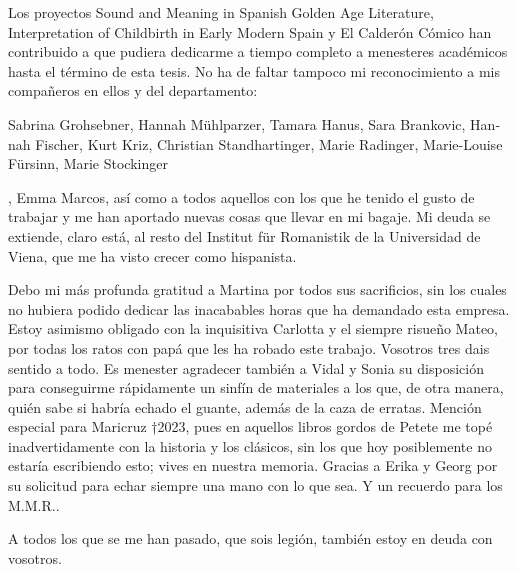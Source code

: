 Los proyectos Sound and Meaning in Spanish Golden Age Literature,  Interpretation of Childbirth in Early Modern Spain y El Calderón Cómico han contribuido a que pudiera dedicarme a tiempo completo a menesteres académicos hasta el término de esta tesis. No ha de faltar tampoco mi reconocimiento a mis compañeros en ellos y del departamento: \begin{german}Sabrina Grohsebner, Hannah Mühlparzer, Tamara Hanus, Sara Brankovic, Hannah Fischer, Kurt Kriz, Christian Standhartinger, Marie Radinger, Marie-Louise Fürsinn, Marie Stockinger\end{german}, Emma Marcos, así como a todos aquellos con los que he tenido el gusto de trabajar y me han aportado nuevas cosas que llevar en mi bagaje. Mi deuda se extiende, claro está, al resto del Institut für Romanistik de la Universidad de Viena, que me ha visto crecer como hispanista.

Debo mi más profunda gratitud a Martina por todos sus sacrificios, sin los cuales no hubiera podido dedicar las inacabables horas que ha demandado esta empresa. Estoy asimismo obligado con la inquisitiva Carlotta y el siempre risueño Mateo, por todas los ratos con papá que les ha robado este trabajo. Vosotros tres dais sentido a todo. Es menester agradecer también a Vidal y Sonia su disposición para conseguirme rápidamente un sinfín de materiales a los que, de otra manera, quién sabe si habría echado el guante, además de la caza de erratas. Mención especial para Maricruz †2023, pues en aquellos libros gordos de Petete me topé inadvertidamente con la historia y los clásicos, sin los que hoy posiblemente no estaría escribiendo esto; vives en nuestra memoria. Gracias a Erika y Georg por su solicitud para echar siempre una mano con lo que sea. Y un recuerdo para los {M.M.R.}.

A todos los que se me han pasado, que sois legión, también estoy en deuda con vosotros.\cleardoublepage
